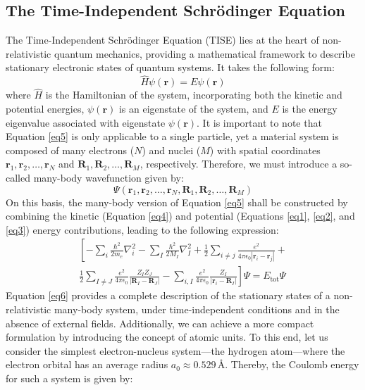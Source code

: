 \subsection{The Time-Independent Schrödinger Equation}
The Time-Independent Schrödinger Equation (TISE) lies at the heart of non-relativistic quantum mechanics, providing a mathematical framework to describe stationary electronic states of quantum systems. It takes the following form:
\begin{equation}
  \label{eq5}
  \hat{H} \psi(\mathbf{r}) = E \psi(\mathbf{r})
\end{equation}
where $\hat{H}$ is the Hamiltonian of the system, incorporating both the kinetic and potential energies, $\psi(\mathbf{r})$ is an eigenstate of the system, and $E$ is the energy eigenvalue associated with eigenstate $\psi(\mathbf{r})$.  It is important to note that Equation \ref{eq5} is only applicable to a single particle, yet a material system is composed of many electrons ($N$) and nuclei ($M$) with spatial coordinates $\mathbf{r}_1, \mathbf{r}_2, \ldots, \mathbf{r}_N$ and $\mathbf{R}_1, \mathbf{R}_2, \ldots, \mathbf{R}_M$, respectively. Therefore, we must introduce a so-called many-body wavefunction given by:
\begin{equation}
  \Psi(\mathbf{r}_1, \mathbf{r}_2, \ldots, \mathbf{r}_N, \mathbf{R}_1, \mathbf{R}_2, \ldots, \mathbf{R}_M)
  \label{eq5b}
\end{equation}
On this basis, the many-body version of Equation \ref{eq5} shall be constructed by combining the kinetic (Equation \ref{eq4}) and potential (Equations \ref{eq1}, \ref{eq2}, and \ref{eq3}) energy contributions, leading to the following expression:
\begin{equation}
  \label{eq6}
  \begin{split}
    \left[
      -\sum_i \frac{\hbar^2}{2m_e} \nabla_i^2 
      - \sum_I \frac{\hbar^2}{2M_I} \nabla_I^2 
      + \frac{1}{2} \sum_{i\neq j} \frac{e^2}{4\pi\epsilon_0 |\mathbf{r}_i - \mathbf{r}_j|} +\right. \\
      \left. \frac{1}{2} \sum_{I\neq J} \frac{e^2}{4\pi\epsilon_0} \frac{Z_I Z_J}{|\mathbf{R}_I - \mathbf{R}_J|} 
      - \sum_{i, I} \frac{e^2}{4\pi\epsilon_0} \frac{Z_I}{|\mathbf{r}_i - \mathbf{R}_I|}
    \right]\Psi = E_{\text{tot}} \Psi
  \end{split}
\end{equation}
Equation \ref{eq6} provides a complete description of the stationary states of a non-relativistic many-body system, under time-independent conditions and in the absence of external fields. Additionally, we can achieve a more compact formulation by introducing the concept of atomic units. To this end, let us consider the simplest electron-nucleus system---the hydrogen atom---where the electron orbital has an average radius $a_0 \approx 0.529 \, \text{Å}$. Thereby, the Coulomb energy for such a system is given by:
